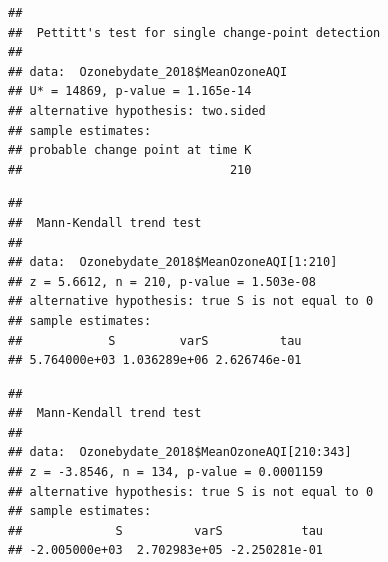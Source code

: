 \documentclass[12pt,]{article}
\newenvironment{Shaded}{\begin{snugshade}}{\end{snugshade}}
\newcommand{\KeywordTok}[1]{\textcolor[rgb]{0.13,0.29,0.53}{\textbf{#1}}}
\newcommand{\DecValTok}[1]{\textcolor[rgb]{0.00,0.00,0.81}{#1}}
\newcommand{\CommentTok}[1]{\textcolor[rgb]{0.56,0.35,0.01}{\textit{#1}}}
\newcommand{\OperatorTok}[1]{\textcolor[rgb]{0.81,0.36,0.00}{\textbf{#1}}}
\newcommand{\NormalTok}[1]{#1}
\begin{document}
\begin{Shaded}
\end{Shaded}

\begin{verbatim}
## 
##  Pettitt's test for single change-point detection
## 
## data:  Ozonebydate_2018$MeanOzoneAQI
## U* = 14869, p-value = 1.165e-14
## alternative hypothesis: two.sided
## sample estimates:
## probable change point at time K 
##                             210
\end{verbatim}

\begin{Shaded}
\end{Shaded}

\begin{verbatim}
## 
##  Mann-Kendall trend test
## 
## data:  Ozonebydate_2018$MeanOzoneAQI[1:210]
## z = 5.6612, n = 210, p-value = 1.503e-08
## alternative hypothesis: true S is not equal to 0
## sample estimates:
##            S         varS          tau 
## 5.764000e+03 1.036289e+06 2.626746e-01
\end{verbatim}

\begin{Shaded}
\end{Shaded}

\begin{verbatim}
## 
##  Mann-Kendall trend test
## 
## data:  Ozonebydate_2018$MeanOzoneAQI[210:343]
## z = -3.8546, n = 134, p-value = 0.0001159
## alternative hypothesis: true S is not equal to 0
## sample estimates:
##             S          varS           tau 
## -2.005000e+03  2.702983e+05 -2.250281e-01
\end{verbatim}
\end{document}
